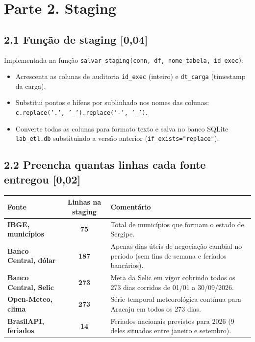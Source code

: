 \documentclass[11pt,a4paper]{article}
\begin{document}
\section*{Parte 2. Staging}

\subsection*{2.1 Função de staging \textnormal{[0,04]}}
Implementada na função \texttt{salvar\_staging(conn, df, nome\_tabela, id\_exec)}:
\begin{itemize}
    \item Acrescenta as colunas de auditoria \texttt{id\_exec} (inteiro) e \texttt{dt\_carga} (timestamp da carga).
    \item Substitui pontos e hífens por sublinhado nos nomes das colunas: \texttt{c.replace('.', '\_').replace('-', '\_')}.
    \item Converte todas as colunas para formato texto e salva no banco SQLite \texttt{lab\_etl.db} substituindo a versão anterior (\texttt{if\_exists="replace"}).
\end{itemize}

\subsection*{2.2 Preencha quantas linhas cada fonte entregou \textnormal{[0,02]}}

\begin{table}[h!]
\centering
\small
\begin{tabularx}{0.9\textwidth}{l c X}
\toprule
\textbf{Fonte} & \textbf{Linhas na staging} & \textbf{Comentário} \\
\midrule
\textbf{IBGE, municípios} & \textbf{75} & Total de municípios que formam o estado de Sergipe. \\
\textbf{Banco Central, dólar} & \textbf{187} & Apenas dias úteis de negociação cambial no período (sem fins de semana e feriados bancários). \\
\textbf{Banco Central, Selic} & \textbf{273} & Meta da Selic em vigor cobrindo todos os 273 dias corridos de 01/01 a 30/09/2026. \\
\textbf{Open-Meteo, clima} & \textbf{273} & Série temporal meteorológica contínua para Aracaju em todos os 273 dias. \\
\textbf{BrasilAPI, feriados} & \textbf{14} & Feriados nacionais previstos para 2026 (9 deles situados entre janeiro e setembro). \\
\bottomrule
\end{tabularx}
\end{table}
\end{document}
